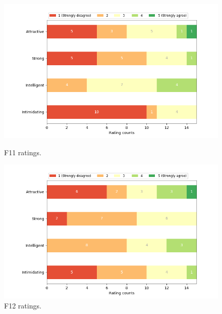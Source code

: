 \begin{figure}[H]
  \includegraphics[width=\linewidth]{Survey/FRatings/avatar_f11.png}
  \caption{F11 ratings.}
\endminipage\hfill
{}
  \includegraphics[width=\linewidth]{Survey/FRatings/avatar_f12.png}
  \caption{F12 ratings.}
\endminipage\hfill
\end{figure}

